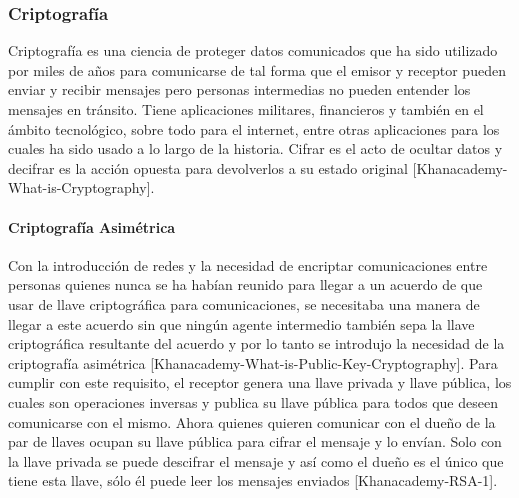 \subsubsection{Criptografía}
Criptografía es una ciencia de proteger datos comunicados que ha sido utilizado por miles de años para comunicarse de tal forma que el emisor y receptor pueden enviar y recibir mensajes pero personas intermedias no pueden entender los mensajes en tránsito. Tiene aplicaciones militares, financieros y también en el ámbito tecnológico, sobre todo para el internet, entre otras aplicaciones para los cuales ha sido usado a lo largo de la historia. Cifrar es el acto de ocultar datos y decifrar es la acción opuesta para devolverlos a su estado original [Khanacademy-What-is-Cryptography].

\paragraph{Criptografía Asimétrica}
Con la introducción de redes y la necesidad de encriptar comunicaciones entre personas quienes nunca se ha habían reunido para llegar a un acuerdo de que usar de llave criptográfica para comunicaciones, se necesitaba una manera de llegar a este acuerdo sin que ningún agente intermedio también sepa la llave criptográfica resultante del acuerdo y por lo tanto se introdujo la necesidad de la criptografía asimétrica [Khanacademy-What-is-Public-Key-Cryptography]. Para cumplir con este requisito, el receptor genera una llave privada y llave pública, los cuales son operaciones inversas y publica su llave pública para todos que deseen comunicarse con el mismo. Ahora quienes quieren comunicar con el dueño de la par de llaves ocupan su llave pública para cifrar el mensaje y lo envían. Solo con la llave privada se puede descifrar el mensaje y así como el dueño es el único que tiene esta llave, sólo él puede leer los mensajes enviados [Khanacademy-RSA-1].

